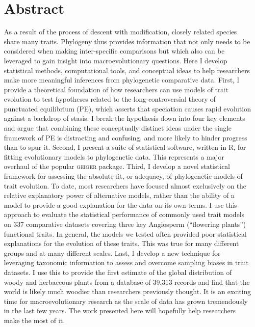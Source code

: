 \chapter*{Abstract}

As a result of the process of descent with modification, closely related species share many traits. Phylogeny thus provides information that not only needs to be considered when making inter-specific comparisons but which also can be leveraged to gain insight into macroevolutionary questions. Here I develop statistical methods, computational tools, and conceptual ideas to help researchers make more meaningful inferences from phylogenetic comparative data. First, I provide a theoretical foundation of how researchers can use models of trait evolution to test hypotheses related to the long-controversial theory of punctuated equilibrium (PE), which asserts that speciation causes rapid evolution against a backdrop of stasis. I break the hypothesis down into four key elements and argue that combining these conceptually distinct ideas under the single framework of PE is distracting and confusing, and more likely to hinder progress than to spur it. Second, I present a suite of statistical software, written in R, for fitting evolutionary models to phylogenetic data. This represents a major overhaul of the popular \textsc{geiger} package. Third, I develop a novel statistical framework for assessing the absolute fit, or adequacy, of phylogenetic models of trait evolution. To date, most researchers have focused almost exclusively on the relative explanatory power of alternative models, rather than the ability of a model to provide a good explanation for the data on its own terms. I use this approach to evaluate the statistical performance of commonly used trait models on 337 comparative datasets covering three key Angiosperm (``flowering plants'') functional traits. In general, the models we tested often provided poor statistical explanations for the evolution of these traits. This was true for many different groups and at many different scales. Last, I develop a new technique for leveraging taxonomic information to assess and overcome sampling biases in trait datasets. I use this to provide the first estimate of the global distribution of woody and herbaceous plants from a database of 39,313 records and find that the world is likely much woodier than researchers previously thought. It is an exciting time for macroevolutionary research as the scale of data has grown tremendously in the last few years. The work presented here will hopefully help researchers make the most of it.

